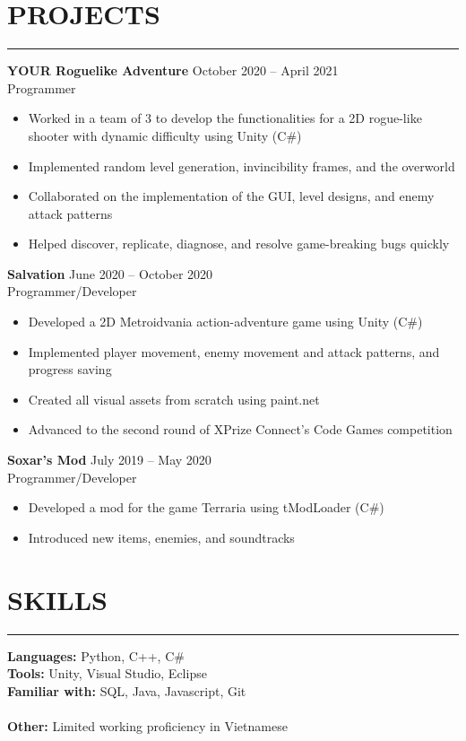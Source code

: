 \documentclass{article}
\begin{document}
\section*{PROJECTS} \vspace{-6pt} \hrule \vspace{6pt}
\textbf{YOUR Roguelike Adventure} \hfill October 2020 -- April 2021\\
Programmer
\begin{itemize}
	\item\vspace{-6pt} Worked in a team of 3 to develop the functionalities for a 2D rogue-like shooter with dynamic difficulty using Unity (C$\#$)
	\item\vspace{-6pt} Implemented random level generation, invincibility frames, and the overworld
	\item\vspace{-6pt} Collaborated on the implementation of the GUI, level designs, and enemy attack patterns
	\item\vspace{-6pt} Helped discover, replicate, diagnose, and resolve game-breaking bugs quickly
\end{itemize}
\vspace{-6pt}
\textbf{Salvation} \hfill June 2020 -- October 2020\\
Programmer/Developer
\begin{itemize}
	\item\vspace{-6pt} Developed a 2D Metroidvania action-adventure game using Unity (C$\#$)
	\item\vspace{-6pt} Implemented player movement, enemy movement and attack patterns, and progress saving
	\item\vspace{-6pt} Created all visual assets from scratch using paint.net
	\item\vspace{-6pt} Advanced to the second round of XPrize Connect's Code Games competition

\end{itemize}
\vspace{-6pt}
\textbf{Soxar's Mod} \hfill July 2019 -- May 2020\\
Programmer/Developer
\begin{itemize}
	\item\vspace{-6pt} Developed a mod for the game Terraria using tModLoader (C$\#$)
	\item\vspace{-6pt} Introduced new items, enemies, and soundtracks
\end{itemize}
\vspace{-20pt}

\section*{SKILLS} \vspace{-6pt} \hrule \vspace{6pt}
\textbf{Languages:} Python, C++, C$\#$ \\
\textbf{Tools:} Unity, Visual Studio, Eclipse\\
\textbf{Familiar with:} SQL, Java, Javascript, Git \\\vspace{-6pt}\\
\textbf{Other:} Limited working proficiency in Vietnamese
\end{document}
